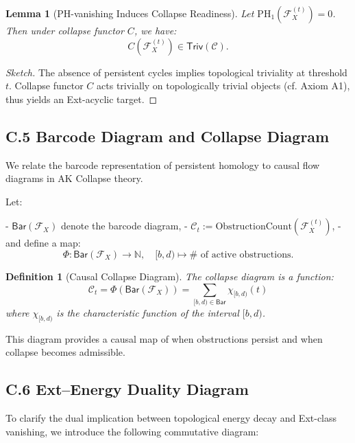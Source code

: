 \documentclass[11pt]{article}
\newtheorem{definition}[theorem]{Definition}
\newtheorem{lemma}[theorem]{Lemma}
\begin{document}
\begin{lemma}[PH-vanishing Induces Collapse Readiness]
Let \( \mathrm{PH}_1(\mathcal{F}_X^{(t)}) = 0 \). Then under collapse functor \( C \), we have:
\[
C(\mathcal{F}_X^{(t)}) \in \mathsf{Triv}(\mathcal{C}).
\]
\end{lemma}

\begin{proof}[Sketch]
The absence of persistent cycles implies topological triviality at threshold \( t \).  
Collapse functor \( C \) acts trivially on topologically trivial objects (cf. Axiom A1),  
thus yields an Ext-acyclic target.
\end{proof}

\subsection*{C.5 Barcode Diagram and Collapse Diagram}

We relate the barcode representation of persistent homology to causal flow diagrams in AK Collapse theory.

Let:

- \( \mathsf{Bar}(\mathcal{F}_X) \) denote the barcode diagram,
- \( \mathcal{C}_t := \mathrm{ObstructionCount}(\mathcal{F}_X^{(t)}) \),
- and define a map:
\[
\Phi : \mathsf{Bar}(\mathcal{F}_X) \to \mathbb{N}, \quad [b,d) \mapsto \# \text{ of active obstructions}.
\]

\begin{definition}[Causal Collapse Diagram]
The collapse diagram is a function:
\[
\mathcal{C}_t = \Phi(\mathsf{Bar}(\mathcal{F}_X)) = \sum_{[b,d) \in \mathsf{Bar}} \chi_{[b,d)}(t)
\]
where \( \chi_{[b,d)} \) is the characteristic function of the interval \( [b,d) \).
\end{definition}

This diagram provides a causal map of when obstructions persist and when collapse becomes admissible.

\subsection*{C.6 Ext–Energy Duality Diagram}

To clarify the dual implication between topological energy decay and Ext-class vanishing, we introduce the following commutative diagram:

\begin{center}
\end{center}
\end{document}
